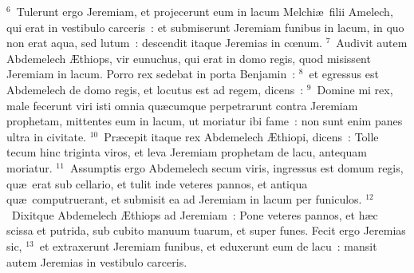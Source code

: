 ${}^{6}$~Tulerunt ergo Jeremiam, et projecerunt eum in lacum Melchi\ae\ filii Amelech, qui erat in vestibulo carceris~: et submiserunt Jeremiam funibus in lacum, in quo non erat aqua, sed lutum~: descendit itaque Jeremias in cœnum.
${}^{7}$~Audivit autem Abdemelech \AE thiops, vir eunuchus, qui erat in domo regis, quod misissent Jeremiam in lacum. Porro rex sedebat in porta Benjamin~:
${}^{8}$~et egressus est Abdemelech de domo regis, et locutus est ad regem, dicens~:
${}^{9}$~Domine mi rex, male fecerunt viri isti omnia qu\ae cumque perpetrarunt contra Jeremiam prophetam, mittentes eum in lacum, ut moriatur ibi fame~: non sunt enim panes ultra in civitate.
${}^{10}$~Pr\ae cepit itaque rex Abdemelech \AE thiopi, dicens~: Tolle tecum hinc triginta viros, et leva Jeremiam prophetam de lacu, antequam moriatur.
${}^{11}$~Assumptis ergo Abdemelech secum viris, ingressus est domum regis, qu\ae\ erat sub cellario, et tulit inde veteres pannos, et antiqua qu\ae\ computruerant, et submisit ea ad Jeremiam in lacum per funiculos.
${}^{12}$~Dixitque Abdemelech \AE thiops ad Jeremiam~: Pone veteres pannos, et h\ae c scissa et putrida, sub cubito manuum tuarum, et super funes. Fecit ergo Jeremias sic,
${}^{13}$~et extraxerunt Jeremiam funibus, et eduxerunt eum de lacu~: mansit autem Jeremias in vestibulo carceris.


